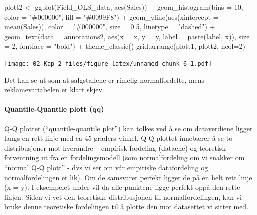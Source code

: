 \documentclass[
]{article}
\newenvironment{Shaded}{\begin{snugshade}}{\end{snugshade}}
\newcommand{\AttributeTok}[1]{\textcolor[rgb]{0.77,0.63,0.00}{#1}}
\newcommand{\DecValTok}[1]{\textcolor[rgb]{0.00,0.00,0.81}{#1}}
\newcommand{\FloatTok}[1]{\textcolor[rgb]{0.00,0.00,0.81}{#1}}
\newcommand{\FunctionTok}[1]{\textcolor[rgb]{0.00,0.00,0.00}{#1}}
\newcommand{\NormalTok}[1]{#1}
\newcommand{\OtherTok}[1]{\textcolor[rgb]{0.56,0.35,0.01}{#1}}
\newcommand{\SpecialCharTok}[1]{\textcolor[rgb]{0.00,0.00,0.00}{#1}}
\newcommand{\StringTok}[1]{\textcolor[rgb]{0.31,0.60,0.02}{#1}}
\begin{document}
\begin{Shaded}
\begin{Highlighting}[]
\NormalTok{plott2 }\OtherTok{\textless{}{-}} \FunctionTok{ggplot}\NormalTok{(Field\_OLS\_data, }\FunctionTok{aes}\NormalTok{(Sales)) }\SpecialCharTok{+} 
  \FunctionTok{geom\_histogram}\NormalTok{(}\AttributeTok{bins =} \DecValTok{10}\NormalTok{, }\AttributeTok{color =} \StringTok{"\#000000"}\NormalTok{, }\AttributeTok{fill =} \StringTok{"\#0099F8"}\NormalTok{) }\SpecialCharTok{+} 
    \FunctionTok{geom\_vline}\NormalTok{(}\FunctionTok{aes}\NormalTok{(}\AttributeTok{xintercept =} \FunctionTok{mean}\NormalTok{(Sales)), }\AttributeTok{color =} \StringTok{"\#000000"}\NormalTok{, }\AttributeTok{size =} \FloatTok{0.5}\NormalTok{, }\AttributeTok{linetype =} \StringTok{"dashed"}\NormalTok{) }\SpecialCharTok{+} 
 \FunctionTok{geom\_text}\NormalTok{(}\AttributeTok{data =}\NormalTok{ annotations2, }\FunctionTok{aes}\NormalTok{(}\AttributeTok{x =}\NormalTok{ x, }\AttributeTok{y =}\NormalTok{ y, }\AttributeTok{label =} \FunctionTok{paste}\NormalTok{(label, x)), }\AttributeTok{size =} \DecValTok{2}\NormalTok{, }\AttributeTok{fontface =} \StringTok{"bold"}\NormalTok{) }\SpecialCharTok{+}
      \FunctionTok{theme\_classic}\NormalTok{()}
\FunctionTok{grid.arrange}\NormalTok{(plott1, plott2, }\AttributeTok{ncol=}\DecValTok{2}\NormalTok{)}
\end{Highlighting}
\end{Shaded}

\texttt{[image: 02\_Kap\_2\_files/figure-latex/unnamed-chunk-6-1.pdf]}

Det kan se ut som at salgstallene er rimelig normalfordelte, mens reklamevariabelen er klart skjev.

\hypertarget{quantile-quantile-plott-qq}{%
\paragraph{Quantile-Quantile plott (qq)}\label{quantile-quantile-plott-qq}}

Q-Q plottet (``quantile-quantile plot'') kan tolkes ved å se om dataverdiene ligger langs en rett linje med ca 45 graders vinkel. Q-Q plottet innebærer å se to distribusjoner mot hverandre -- empirisk fordeling (dataene) og teoretisk forventning ut fra en fordelingsmodell (som normalfordeling om vi snakker om ``normal Q-Q plott'' - dvs vi ser om vår empiriske datafordeling og normalfordelingen er lik). Om de samsvarer perfekt ligger de på en helt rett linje (x = y). I eksempelet under vil da alle punktene ligge perfekt oppå den rette linjen. Siden vi vet den teoretiske distribusjonen til normalfordelingen, kan vi bruke denne teoretiske fordelingen til å plotte den mot datasettet vi sitter med.
\end{document}
